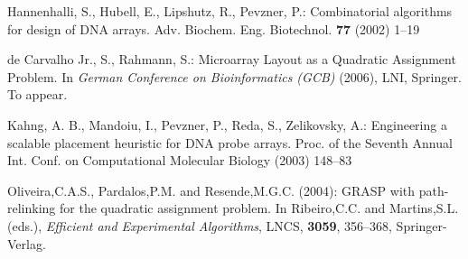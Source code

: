\documentclass[portrait]{a0poster}
\begin{document}
\begin{multicols}{3}[\aggiheader]
\begin{thebibliography}{9}

 Hannenhalli, S., Hubell, E., Lipshutz, R., Pevzner, P.:
Combinatorial algorithms for design of DNA arrays.
Adv. Biochem. Eng. Biotechnol. {\bfseries77} (2002) 1--19

de Carvalho Jr., S., Rahmann, S.:
Microarray Layout as a Quadratic Assignment Problem.
In {\it German Conference on Bioinformatics (GCB)} (2006), LNI, Springer. To appear.

 Kahng, A. B., Mandoiu, I., Pevzner, P., Reda, S., Zelikovsky, A.:
Engineering a scalable placement heuristic for DNA probe arrays.
Proc. of the Seventh Annual Int. Conf. on Computational Molecular Biology (2003) 148--83

 Oliveira,C.A.S., Pardalos,P.M. and Resende,M.G.C. (2004):
GRASP with path-relinking for the quadratic assignment
problem. In Ribeiro,C.C. and Martins,S.L. (eds.), {\it Efficient and
Experimental Algorithms}, LNCS, {\bf 3059},
356--368, Springer-Verlag.

\end{thebibliography}

\end{multicols}

\aggifooter

\end{document}

